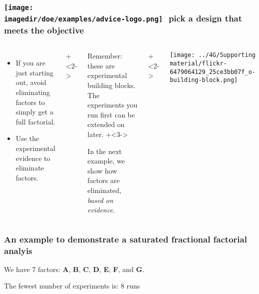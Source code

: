 \begin{frame}\frametitle{\texttt{[image: \\imagedir/doe/examples/advice-logo.png]}\,\, pick a design that meets the objective}
	
	\begin{columns}[T]
		
			\begin{itemize}
				\item	If you are just starting out, avoid eliminating factors to simply get a full factorial.
				\item	Use the experimental evidence to eliminate factors.
			\end{itemize}
			
			
			\vspace{1cm}
			\onslide+<2->{
				\begin{itemize}
					\item	Remember: these are experimental building blocks. The experiments you run first can be extended on later.
					\vspace{0.5cm}
					\onslide+<3->{
						\item	In the next example, we show how factors are eliminated, {\color{myOrange}\emph{based on evidence}}.
					}
				\end{itemize}
			}
	
			\vspace{1cm}
			
			\onslide+<2->{
				\centerline{\texttt{[image: ../4G/Supporting material/flickr-6479064129\_25ce3bb07f\_o-building-block.png]}}
		
			}
	\end{columns}
\end{frame}

\begin{frame}\frametitle{An example to demonstrate a saturated fractional factorial analyis}
	We have 7 factors: \textbf{A}, \textbf{B}, \textbf{C}, \textbf{D}, \textbf{E}, \textbf{F}, and \textbf{G}.
	
	\vspace{1cm}
	The fewest number of experiments is: 8 runs
	\vfill
\end{frame}

